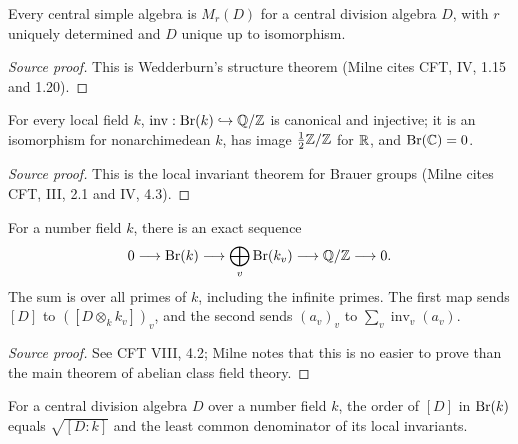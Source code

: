 \begin{proposition}[Wedderburn]\label{prop:milne-wedderburn}
Every central simple algebra is $M_r(D)$ for a central division algebra $D$, with $r$ uniquely determined and $D$ unique up to isomorphism.
\end{proposition}

\begin{proof}[Source proof]

This is Wedderburn's structure theorem (Milne cites CFT, IV, 1.15 and 1.20).

\end{proof}

\begin{theorem}\label{thm:milne-local-brauer}
For every local field $k$, $\operatorname{inv}:\operatorname{Br}(k)\hookrightarrow\mathbb{Q}/\mathbb{Z}$ is canonical and injective; it is an isomorphism for nonarchimedean $k$, has image $\frac12\mathbb{Z}/\mathbb{Z}$ for $\mathbb{R}$, and $\operatorname{Br}(\mathbb{C})=0$.
\end{theorem}

\begin{proof}[Source proof]

This is the local invariant theorem for Brauer groups (Milne cites CFT, III,
2.1 and IV, 4.3).

\end{proof}

\begin{theorem}\label{thm:milne-global-brauer}
For a number field $k$, there is an exact sequence
\[
 0\longrightarrow\operatorname{Br}(k)\longrightarrow\bigoplus_v\operatorname{Br}(k_v)
 \longrightarrow\mathbb{Q}/\mathbb{Z}\longrightarrow0.
\]
The sum is over all primes of $k$, including the infinite primes. The first
map sends $[D]$ to $([D\otimes_k k_v])_v$, and the second sends
$(a_v)_v$ to $\sum_v\operatorname{inv}_v(a_v)$.
\end{theorem}

\begin{proof}[Source proof]

See CFT VIII, 4.2; Milne notes that this is no easier to prove than the main
theorem of abelian class field theory.

\end{proof}

\begin{theorem}\label{thm:milne-brauer-exponent}
For a central division algebra $D$ over a number field $k$, the order of
$[D]$ in $\operatorname{Br}(k)$ equals $\sqrt{[D:k]}$ and the least common denominator of
its local invariants.
\end{theorem}

